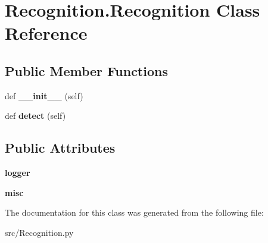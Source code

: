 \hypertarget{class_recognition_1_1_recognition}{}\section{Recognition.\+Recognition Class Reference}
\label{class_recognition_1_1_recognition}
\subsection*{Public Member Functions}
\begin{DoxyCompactItemize}
\item 
\mbox{\label{class_recognition_1_1_recognition_a2f7707bf1fc057ae30c41baefbd7bf38}} 
def {\bfseries \+\_\+\+\_\+init\+\_\+\+\_\+} (self)
\item 
\mbox{\label{class_recognition_1_1_recognition_af1a6506383bb5321b7eb186a7617dfe7}} 
def {\bfseries detect} (self)
\end{DoxyCompactItemize}
\subsection*{Public Attributes}
\begin{DoxyCompactItemize}
\item 
\mbox{\label{class_recognition_1_1_recognition_a7c450f93080f7f5bbcf4c69aabf20489}} 
{\bfseries logger}
\item 
\mbox{\label{class_recognition_1_1_recognition_a6b6d17e10f916f8a158eaef600005bbc}} 
{\bfseries misc}
\end{DoxyCompactItemize}


The documentation for this class was generated from the following file\+:\begin{DoxyCompactItemize}
\item 
src/Recognition.\+py\end{DoxyCompactItemize}
